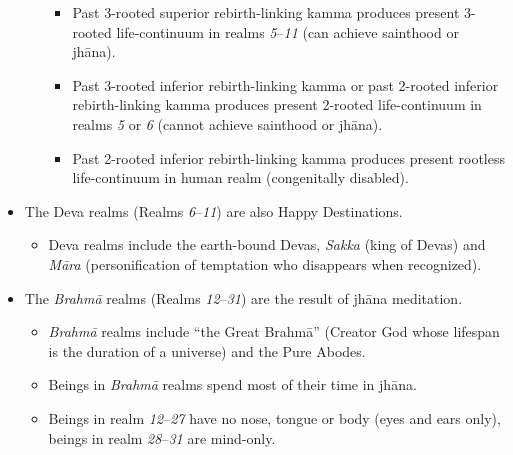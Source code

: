 \begin{itemize}
\begin{itemize}
\begin{itemize}
\item Past 3-rooted superior rebirth-linking kamma produces present 3-rooted life-continuum in realms \textit{5}--\textit{11} (can achieve sainthood or jhāna).

\item Past 3-rooted inferior rebirth-linking kamma or past 2-rooted inferior rebirth-linking kamma produces present 2-rooted life-continuum in realms \textit{5} or \textit{6} (cannot achieve sainthood or jhāna).

\item Past 2-rooted inferior rebirth-linking kamma produces present rootless life-continuum in human realm (congenitally disabled).

\end{itemize}

\end{itemize}

\item The Deva realms (Realms \textit{6}--\textit{11}) are also Happy Destinations.

\begin{itemize}

\item Deva realms include the earth-bound Devas, \textit{Sakka} (king of Devas) and \textit{Māra} (personification of temptation who disappears when recognized).

\end{itemize}

\item The \textit{Brahmā} realms (Realms \textit{12}--\textit{31}) are the result of jhāna meditation.

\begin{itemize}

\item \textit{Brahmā} realms include “the Great Brahmā” (Creator God whose lifespan is the duration of a universe) and the Pure Abodes.

\item Beings in \textit{Brahmā} realms spend most of their time in jhāna.

\item Beings in realm \textit{12}--\textit{27} have no nose, tongue or body (eyes and ears only), beings in realm \textit{28}--\textit{31} are mind-only.

\end{itemize}

\end{itemize}

